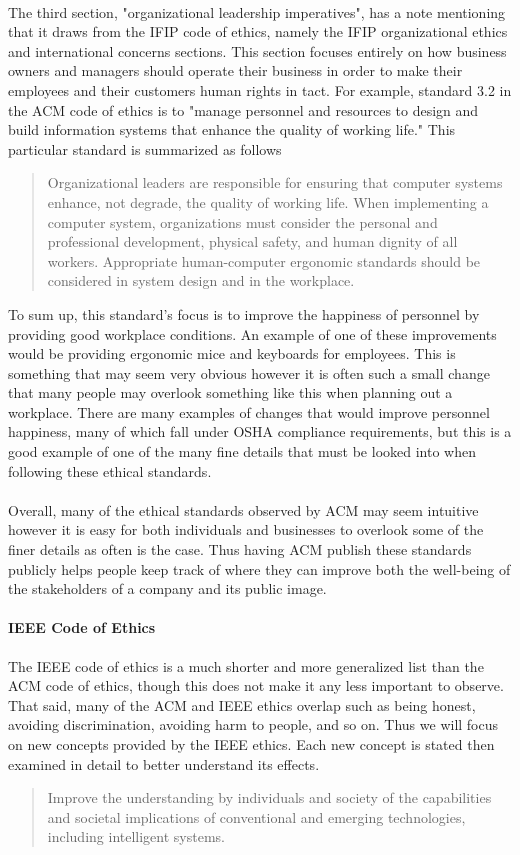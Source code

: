 \documentclass[a4paper,12pt]{article}
\begin{document}
\paragraph{}The third section, "organizational leadership imperatives", has a note mentioning that it draws from the IFIP code of ethics, namely the IFIP organizational ethics and international concerns sections. This section focuses entirely on how business owners and managers should operate their business in order to make their employees and their customers human rights in tact. For example, standard 3.2 in the ACM code of ethics is to "manage personnel and resources to design and build information systems that enhance the quality of working life." This particular standard is summarized as follows
	\begin{quote}
	Organizational leaders are responsible for ensuring that computer systems enhance, not degrade, the quality of working life. When implementing a computer system, organizations must consider the personal and professional development, physical safety, and human dignity of all workers. Appropriate human-computer ergonomic standards should be considered in system design and in the workplace.
	\end{quote}
To sum up, this standard's focus is to improve the happiness of personnel by providing good workplace conditions. An example of one of these improvements would be providing ergonomic mice and keyboards for employees. This is something that may seem very obvious however it is often such a small change that many people may overlook something like this when planning out a workplace. There are many examples of changes that would improve personnel happiness, many of which fall under OSHA compliance requirements, but this is a good example of one of the many fine details that must be looked into when following these ethical standards.
\paragraph{}Overall, many of the ethical standards observed by ACM may seem intuitive however it is easy for both individuals and businesses to overlook some of the finer details as often is the case. Thus having ACM publish these standards publicly helps people keep track of where they can improve both the well-being of the stakeholders of a company and its public image.
\paragraph{IEEE Code of Ethics}The IEEE code of ethics is a much shorter and more generalized list than the ACM code of ethics, though this does not make it any less important to observe. That said, many of the ACM and IEEE ethics overlap such as being honest, avoiding discrimination, avoiding harm to people, and so on. Thus we will focus on new concepts provided by the IEEE ethics. Each new concept is stated then examined in detail to better understand its effects.
	\begin{quote}
	Improve the understanding by individuals and society of the capabilities and societal implications of conventional and emerging technologies, including intelligent systems.
	\end{quote}
\end{document}
